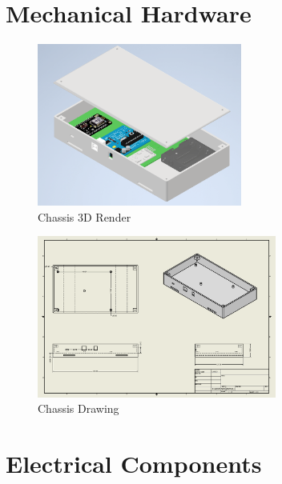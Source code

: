 \documentclass[12pt, titlepage]{article}
\begin{document}
\section{Mechanical Hardware}
  \begin{figure}[h!]
    \begin{center}
    \includegraphics[width=0.6\textwidth]{Chassis_3D_Render.png}
    \caption{Chassis 3D Render}
    \label{Fig_SystemContext} 
    \end{center}
    \end{figure}

  \begin{figure}[h!]
    \begin{center}
    \includegraphics[width=0.7\textwidth]{Chassis_Drawing.png}
    \caption{Chassis Drawing}
    \label{Fig_SystemContext} 
    \end{center}
    \end{figure}


\newpage
\section{Electrical Components}
\end{document}
